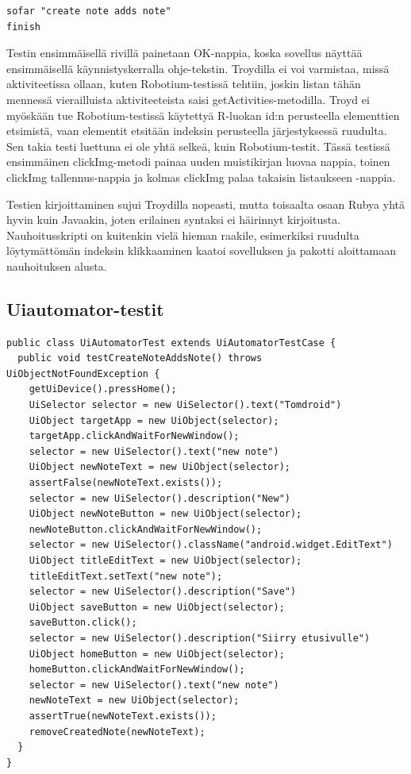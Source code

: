 \begin{lstlisting}[float, label=troyd_record_save,caption=Testin tallennus nauhoitusskriptistä Troydilla]
sofar "create note adds note"
finish
\end{lstlisting}

Testin ensimmäisellä rivillä painetaan OK-nappia, koska sovellus näyttää ensimmäisellä käynnistyskerralla ohje-tekstin. Troydilla ei voi varmistaa, missä aktiviteetissa ollaan, kuten Robotium-testissä tehtiin, joskin listan tähän mennessä vierailluista aktiviteeteista saisi getActivities-metodilla. Troyd ei myöskään tue Robotium-testissä käytettyä R-luokan id:n perusteella elementtien etsimistä, vaan elementit etsitään indeksin perusteella järjestyksessä ruudulta. Sen takia testi luettuna ei ole yhtä selkeä, kuin Robotium-testit. Tässä testissä ensimmäinen clickImg-metodi painaa uuden muistikirjan luovaa nappia, toinen clickImg tallennus-nappia ja kolmas clickImg palaa takaisin listaukseen -nappia.

Testien kirjoittaminen sujui Troydilla nopeasti, mutta toisaalta osaan Rubya yhtä hyvin kuin Javaakin, joten erilainen syntaksi ei häirinnyt kirjoitusta. Nauhoitusskripti on kuitenkin vielä hieman raakile, esimerkiksi ruudulta löytymättömän indeksin klikkaaminen kaatoi sovelluksen ja pakotti aloittamaan nauhoituksen alusta.

\subsection{Uiautomator-testit}

\begin{lstlisting}[float, label=uiautomator_createnote,caption=Muistikirjan luontitesti Uiautomatorilla]
public class UiAutomatorTest extends UiAutomatorTestCase {
  public void testCreateNoteAddsNote() throws UiObjectNotFoundException {
    getUiDevice().pressHome();
    UiSelector selector = new UiSelector().text("Tomdroid")
    UiObject targetApp = new UiObject(selector);
    targetApp.clickAndWaitForNewWindow();
    selector = new UiSelector().text("new note")
    UiObject newNoteText = new UiObject(selector);
    assertFalse(newNoteText.exists());
    selector = new UiSelector().description("New")
    UiObject newNoteButton = new UiObject(selector);
    newNoteButton.clickAndWaitForNewWindow();
    selector = new UiSelector().className("android.widget.EditText")
    UiObject titleEditText = new UiObject(selector);
    titleEditText.setText("new note");
    selector = new UiSelector().description("Save")
    UiObject saveButton = new UiObject(selector);
    saveButton.click();
    selector = new UiSelector().description("Siirry etusivulle")
    UiObject homeButton = new UiObject(selector);
    homeButton.clickAndWaitForNewWindow();
    selector = new UiSelector().text("new note")
    newNoteText = new UiObject(selector);
    assertTrue(newNoteText.exists());  
    removeCreatedNote(newNoteText);
  }
}
\end{lstlisting}

